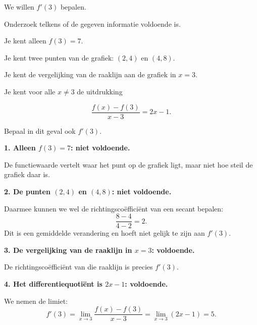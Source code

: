 \documentclass{ximera}
\begin{document}
\begin{oefening}{\oefU\ESS}

We willen $f'(3)$ bepalen.

Onderzoek telkens of de gegeven informatie voldoende is.

\begin{question}
Je kent alleen $f(3)=7$.
\end{question}

\begin{question}
Je kent twee punten van de grafiek: $(2,4)$ en $(4,8)$.
\end{question}

\begin{question}
Je kent de vergelijking van de raaklijn aan de grafiek in $x=3$.
\end{question}

\begin{question}
Je kent voor alle $x\neq3$ de uitdrukking

\[
\frac{f(x)-f(3)}{x-3}=2x-1.
\]

Bepaal in dit geval ook $f'(3)$.
\end{question}

\begin{oplossing}

\textbf{1. Alleen $f(3)=7$: niet voldoende.}

De functiewaarde vertelt waar het punt op de grafiek ligt, maar niet hoe
steil de grafiek daar is.

\medskip

\textbf{2. De punten $(2,4)$ en $(4,8)$: niet voldoende.}

Daarmee kunnen we wel de richtingscoëfficiënt van een secant bepalen:
\[
\frac{8-4}{4-2}=2.
\]
Dit is een gemiddelde verandering en hoeft niet gelijk te zijn aan
$f'(3)$.

\medskip

\textbf{3. De vergelijking van de raaklijn in $x=3$: voldoende.}

De richtingscoëfficiënt van die raaklijn is precies $f'(3)$.

\medskip

\textbf{4. Het differentiequotiënt is $2x-1$: voldoende.}

We nemen de limiet:
\[
f'(3)
=
\lim_{x\to3}
\frac{f(x)-f(3)}{x-3}
=
\lim_{x\to3}(2x-1)
=
\boxed{5}.
\]

\end{oplossing}

\end{oefening}
\end{document}

